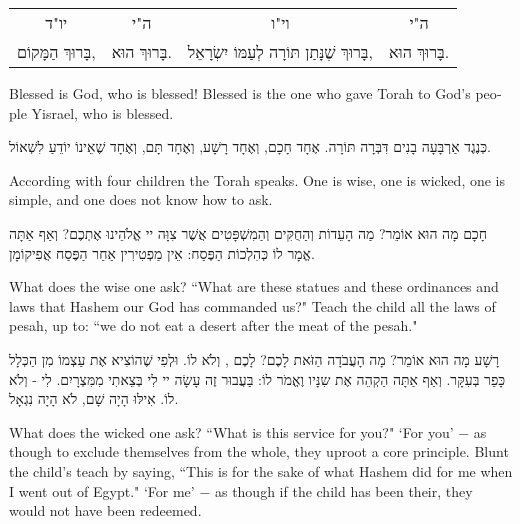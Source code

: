 \vspace{1em}

\begin{tabular}{c c c c}
{\small \instructionfont
יו"ד
} & {\small \instructionfont
ה"י
} & {\small \instructionfont
וי"ו
} & {\small \instructionfont
ה"י 
} \\
בָּרוּךְ הַמָּקוֹם, 
& בָּרוּךְ הוּא. 
& בָּרוּךְ שֶׁנָּתַן תּוֹרָה לְעַמּוֹ יִשְׂרָאֵל, 
& בָּרוּךְ הוּא. \\
\end{tabular}

\begin{english}
Blessed is God, who is blessed! Blessed is the one who gave Torah to God's people Yisrael, who is blessed.
\end{english}

\vspace{1em}

כְּנֶגֶד אַרְבָּעָה בָנִים דִּבְּרָה תּוֹרָה. אֶחָד חָכָם, וְאֶחָד רָשָׁע, וְאֶחָד תָּם, וְאֶחָד שֶׁאֵינוֹ יוֹדֵעַ לִשְׁאוֹל.

\begin{english}
According with four children the Torah speaks. One is wise, one is wicked, one is simple, and one does not know how to ask.
\end{english}

חָכָם מָה הוּא אוֹמֵר? מַה הָעֵדוֹת וְהַחֻקִּים וְהַמִשְׁפָּטִים אֲשֶׁר צִוָּה יי אֱלֹהֵינוּ אֶתְכֶם? וְאַף אַתָּה אֱמָר לוֹ כְּהִלְכוֹת הַפֶּסַח: אֵין מַפְטִירִין אַחַר הַפֶּסַח אֲפִיקוֹמָן.

\begin{english}
What does the wise one ask? ``What are these statues and these ordinances and laws that Hashem our God has commanded us?" Teach the child all the laws of pesah, up to: ``we do not eat a desert after the meat of the pesah."
\end{english}

רָשָׁע מָה הוּא אוֹמֵר? מָה הָעֲבֹדָה הַזֹּאת לָכֶם? לָכֶם , וְלֹא לוֹ. וּלְפִי שֶׁהוֹצִיא אֶת עַצְמוֹ מִן הַכְּלָל כָּפַר בְּעִקָּר. וְאַף אַתָּה הַקְהֵה אֶת שִנָּיו וֶאֱמֹר לוֹ: בַּעֲבוּר זֶה עָשָׂה יי לִי בְּצֵאתִי מִמִּצְרָיִם. לִי - וְלֹא לוֹ. אִילּוּ הָיָה שָׁם, לֹא הָיָה נִגְאָל.

\begin{english}
What does the wicked one ask? ``What is this service for you?" `For you' $-$ as though to exclude themselves from the whole, they uproot a core principle. Blunt the child's teach by saying, ``This is for the sake of what Hashem did for me when I went out of Egypt." `For me' $-$ as though if the child has been their, they would not have been redeemed.
\end{english}

